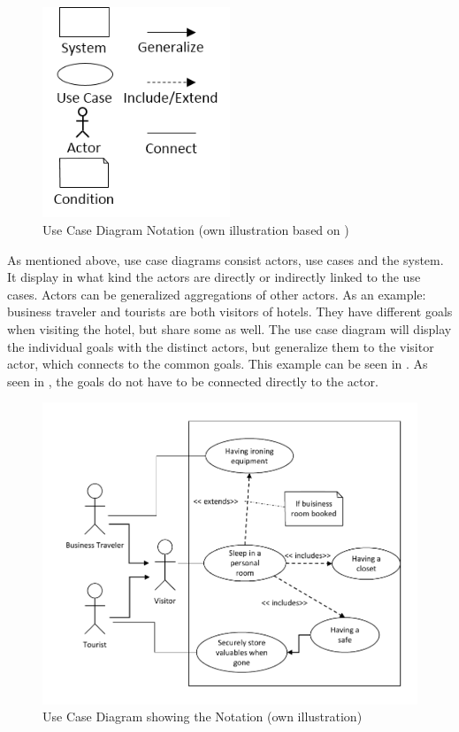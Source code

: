 \paragraph{} 
\begin{figure}
    \centering
    \includegraphics[width=0.5\textwidth]{img/ucSymb.png}
    \caption[Use Case Diagram Notation]{Use Case Diagram Notation (own illustration based on \cite[163]{Pohl.2007})}
    \label{fig:ucSymb}
\end{figure}
As mentioned above, use case diagrams consist actors, use cases and the system. It display in what kind the actors are directly or indirectly linked to the use cases. Actors can be generalized aggregations of other actors. As an example: business traveler and tourists are both visitors of hotels. They have different goals when visiting the hotel, but share some as well. The use case diagram will display the individual goals with the distinct actors, but generalize them to the visitor actor, which connects to the common goals. This example can be seen in . As seen in , the goals do not have to be connected directly to the actor.
\begin{figure}[H]
    \centering
    \includegraphics[scale=1]{img/ucEx.pdf}
    \caption[Example Use Case Diagram]{Use Case Diagram showing the Notation (own illustration)}
    \label{fig:ucEx}
\end{figure}
